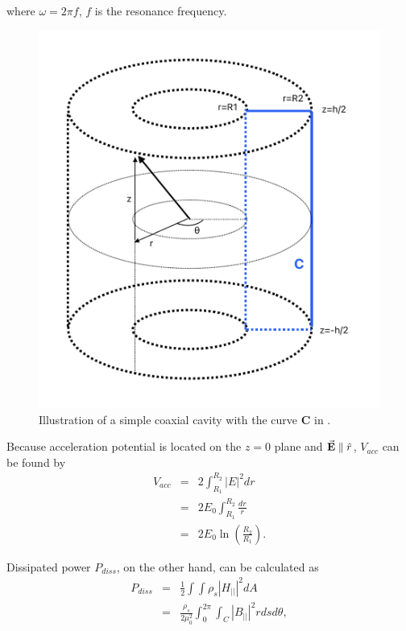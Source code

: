 \documentclass[a4paper,oneside,12pt]{report}
\numberwithin{equation}{chapter}
\begin{document}
\vspace{-33pt}
\noindent
where $\omega=2\pi f$, $f$ is the resonance frequency.

\begin{figure}[H]
    \centering
    \includegraphics[width=.55\textwidth]{./figures/illustrations/rhodo_integral_curve.pdf}
    \vspace{-20pt}
    \caption{Illustration of a simple coaxial cavity with the curve \textbf{C} in .}
    \label{fig:int_curve}
\end{figure}

\vspace{-15pt}
Because acceleration potential is located on the $z=0$ plane and $\vec{\textbf{E}} \parallel \hat{r}$, $V_{acc}$ can be found by
\vspace{-10pt}\begin{eqnarray} 
    V_{acc} &=& 2 \int_{R_1}^{R_2} |E|^2 dr \nonumber\\
            &=& 2 E_0 \int_{R_1}^{R_2} \frac{dr}{r} \nonumber\\
            &=& 2 E_0 \ln(\frac{R_2}{R_1}). \label{eq:v_acc}
\end{eqnarray}

\vspace{-30pt}
\noindent
Dissipated power $P_{diss}$, on the other hand, can be calculated as \cite{rf}
\vspace{-10pt}\begin{eqnarray} 
    P_{diss} &=& \frac{1}{2} \int \int \rho_s | H_{||} |^2 dA \nonumber \\
             &=& \frac{\rho_s}{2\mu_0^2} \int_0^{2\pi} \int_C | B_{||} |^2 r ds d\theta , \label{eq:p_diss_C_curve}
\end{eqnarray}
\end{document}
